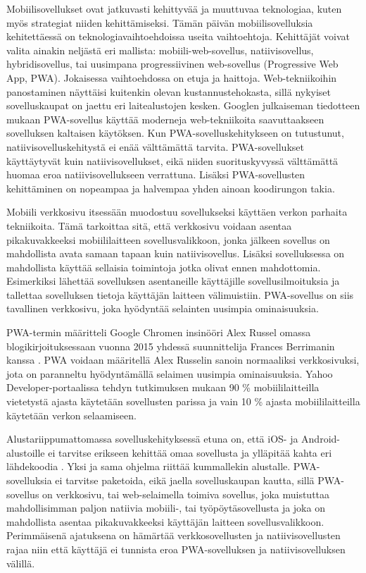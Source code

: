 \documentclass{tktltiki}
\begin{document}
Mobiilisovellukset ovat jatkuvasti kehittyvää ja muuttuvaa teknologiaa, kuten myös strategiat niiden kehittämiseksi. Tämän päivän mobiilisovelluksia kehitettäessä on teknologiavaihtoehdoissa useita vaihtoehtoja. Kehittäjät voivat valita ainakin neljästä eri mallista: mobiili-web-sovellus, natiivisovellus, hybridisovellus, tai uusimpana progressiivinen web-sovellus (Progressive Web App, PWA). Jokaisessa vaihtoehdossa on etuja ja haittoja. Web-tekniikoihin panostaminen näyttäisi kuitenkin olevan kustannustehokasta, sillä nykyiset sovelluskaupat on jaettu eri laitealustojen kesken. Googlen julkaiseman tiedotteen mukaan \cite{Gambhir} PWA-sovellus käyttää moderneja web-tekniikoita saavuttaakseen sovelluksen kaltaisen käytöksen. Kun PWA-sovelluskehitykseen on tutustunut, natiivisovelluskehitystä ei enää välttämättä tarvita. PWA-sovellukset käyttäytyvät kuin natiivisovellukset, eikä niiden suorituskyvyssä välttämättä huomaa eroa natiivisovellukseen verrattuna. Lisäksi PWA-sovellusten kehittäminen on nopeampaa ja halvempaa yhden ainoan koodirungon takia. 

Mobiili verkkosivu itsessään muodostuu sovellukseksi käyttäen verkon parhaita tekniikoita. Tämä tarkoittaa sitä, että verkkosivu voidaan asentaa pikakuvakkeeksi mobiililaitteen sovellusvalikkoon, jonka jälkeen sovellus on mahdollista avata samaan tapaan kuin natiivisovellus. Lisäksi sovelluksessa on mahdollista käyttää sellaisia toimintoja jotka olivat ennen mahdottomia. Esimerkiksi lähettää sovelluksen asentaneille käyttäjille sovellusilmoituksia ja tallettaa sovelluksen tietoja käyttäjän laitteen välimuistiin. PWA-sovellus on siis tavallinen verkkosivu, joka hyödyntää selainten uusimpia ominaisuuksia.

PWA-termin määritteli Google Chromen insinööri Alex Russel \cite{Russell, biorn2017progressive} omassa blogikirjoituksessaan vuonna 2015 yhdessä suunnittelija Frances Berrimanin kanssa \cite{tandelimpact}. PWA voidaan määritellä Alex Russelin sanoin normaaliksi verkkosivuksi, jota on paranneltu hyödyntämällä selaimen uusimpia ominaisuuksia. Yahoo Developer-portaalissa tehdyn tutkimuksen mukaan \cite{Khalaf} 90 \% mobiililaitteilla vietetystä ajasta käytetään sovellusten parissa ja vain 10 \% ajasta mobiililaitteilla käytetään verkon selaamiseen. 

Alustariippumattomassa sovelluskehityksessä etuna on, että iOS- ja Android-alustoille ei tarvitse erikseen kehittää omaa sovellusta ja ylläpitää kahta eri lähdekoodia \cite{xanthopoulos2013comparative}. Yksi ja sama ohjelma riittää kummallekin alustalle. PWA-sovelluksia ei tarvitse paketoida, eikä jaella sovelluskaupan kautta, sillä PWA-sovellus on verkkosivu, tai web-selaimella toimiva sovellus, joka muistuttaa mahdollisimman paljon natiivia mobiili-, tai työpöytäsovellusta ja joka on mahdollista asentaa pikakuvakkeeksi käyttäjän laitteen sovellusvalikkoon. Perimmäisenä ajatuksena on hämärtää verkkosovellusten ja natiivisovellusten rajaa niin että käyttäjä ei tunnista eroa PWA-sovelluksen ja natiivisovelluksen välillä.
\end{document}
